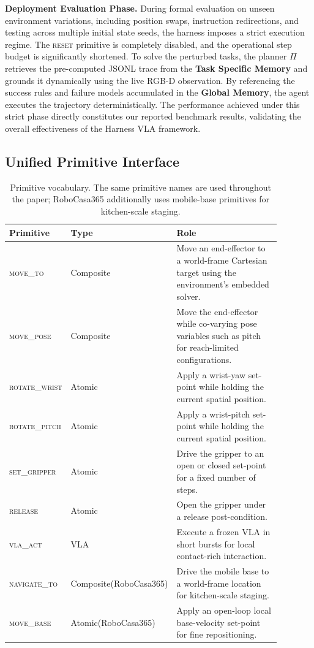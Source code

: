 \documentclass[11pt]{article}
\begin{document}
\textbf{Deployment Evaluation Phase.} During formal evaluation on unseen environment variations, including position swaps, instruction redirections, and testing across multiple initial state seeds, the harness imposes a strict execution regime. The \textsc{reset} primitive is completely disabled, and the operational step budget is significantly shortened. To solve the perturbed tasks, the planner $\Pi$ retrieves the pre-computed JSONL trace from the \textbf{Task Specific Memory} and grounds it dynamically using the live RGB-D observation. By referencing the success rules and failure models accumulated in the \textbf{Global Memory}, the agent executes the trajectory deterministically. The performance achieved under this strict phase directly constitutes our reported benchmark results, validating the overall effectiveness of the Harness VLA framework.

	\subsection{Unified Primitive Interface}
	\label{sec:method:primitives}

\begin{table}[htbp]
\centering
\caption{Primitive vocabulary. The same primitive names are used throughout the paper; RoboCasa365 additionally uses mobile-base primitives for kitchen-scale staging.}
\label{tab:primitive_vocabulary}
\small
\setlength{\tabcolsep}{4pt}
\begin{tabular}{p{0.20\linewidth}p{0.18\linewidth}p{0.50\linewidth}}
\toprule
Primitive & Type & Role \\
\midrule
\textsc{move\_to} & Composite & Move an end-effector to a world-frame Cartesian target using the environment's embedded solver. \\
\textsc{move\_pose} & Composite & Move the end-effector while co-varying pose variables such as pitch for reach-limited configurations. \\
\textsc{rotate\_wrist} & Atomic & Apply a wrist-yaw set-point while holding the current spatial position. \\
\textsc{rotate\_pitch} & Atomic & Apply a wrist-pitch set-point while holding the current spatial position. \\
\textsc{set\_gripper} & Atomic & Drive the gripper to an open or closed set-point for a fixed number of steps. \\
\textsc{release} & Atomic & Open the gripper under a release post-condition. \\
\textsc{vla\_act} & VLA & Execute a frozen VLA in short bursts for local contact-rich interaction. \\
\midrule
\textsc{navigate\_to} & Composite\newline (RoboCasa365) & Drive the mobile base to a world-frame location for kitchen-scale staging. \\
\textsc{move\_base} & Atomic\newline (RoboCasa365) & Apply an open-loop local base-velocity set-point for fine repositioning. \\
\bottomrule
\end{tabular}
\end{table}
\end{document}
